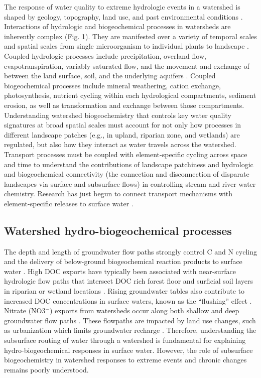 \documentclass[preprint,review, 12pt]{elsarticle}
\begin{document}
The response of water quality to extreme hydrologic events in a watershed is shaped by geology, topography, land use, and past environmental conditions \citep{Kaushal2018f,Kaushal2018g}. Interactions of hydrologic and biogeochemical processes in watersheds are inherently complex (Fig. 1). They are manifested over a variety of temporal scales and spatial scales from single microorganism to individual plants to landscape \citep{Wang2015}. Coupled hydrologic processes include precipitation, overland flow, evapotranspiration, variably saturated flow, and the movement and exchange of between the land surface, soil, and the underlying aquifers \citep{Yu2018}. Coupled biogeochemical processes include mineral weathering, cation exchange, photosynthesis, nutrient cycling within each hydrological compartments, sediment erosion, as well as transformation and exchange between those compartments. Understanding watershed biogeochemistry that controls key water quality signatures at broad spatial scales must account for not only how processes in different landscape patches (e.g., in upland, riparian zone, and wetlands) are regulated, but also how they interact as water travels across the watershed. Transport processes must be coupled with element-specific cycling across space and time to understand the contributions of landscape patchiness and hydrologic and biogeochemical connectivity (the connection and disconnection of disparate landscapes via surface and subsurface flows) in controlling stream and river water chemistry\citep{Harvey2015b}. Research has just begun to connect transport mechanisms with element-specific releases to surface water \citep{Bao2017b,Kaushal2018f}. 

\subsection{Watershed hydro-biogeochemical processes}

The depth and length of groundwater flow paths strongly control C and N cycling and the delivery of below-ground biogeochemical reaction products to surface water \citep{McDonnell2007}. High DOC exports have typically been associated with near‐surface hydrologic flow paths that intersect DOC rich forest floor and surficial soil layers in riparian or wetland locations \citep{Frank2000e,Inamdar2006}. Rising groundwater tables also contribute to increased DOC concentrations in surface waters, known as the “flushing” effect \citep{Creed2008}. Nitrate (NO3$^{-}$) exports from watersheds occur along both shallow and deep groundwater flow paths \citep{Laudon2018b,Inamdar2006,McGlynn2003}. These flowpaths are impacted by land use changes, such as urbanization which limits groundwater recharge \citep{Brown2009}. Therefore, understanding the subsurface routing of water through a watershed is fundamental for explaining hydro-biogeochemical responses in surface water. However, the role of subsurface biogeochemistry in watershed responses to extreme events and chronic changes remains poorly understood.
\end{document}
